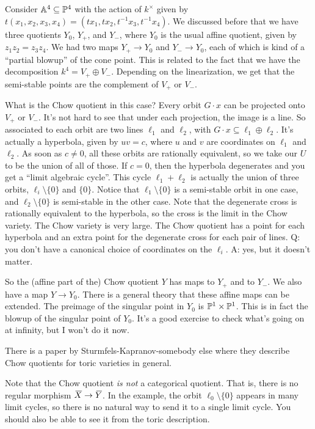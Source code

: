 \begin{example}
 Consider $\mathbb{A}^4\subseteq \mathbb{P}^4$ with the action of $k^\times$ given by $t(x_1,x_2,x_3,x_4)=(tx_1,tx_2,t^{-1}x_3,t^{-1}x_4)$. We discussed before that we have three quotients $Y_0$, $Y_+$, and $Y_-$, where $Y_0$ is the usual affine quotient, given by $z_1z_2=z_3z_4$. We had two maps $Y_+\to Y_0$ and $Y_-\to Y_0$, each of which is kind of a ``partial blowup'' of the cone point. This is related to the fact that we have the decomposition $k^4=V_+\oplus V_-$. Depending on the linearization, we get that the semi-stable points are the complement of $V_+$ or $V_-$.
 
 What is the Chow quotient in this case? Every orbit $G\cdot x$ can be projected onto $V_+$ or $V_-$. It's not hard to see that under each projection, the image is a line. So associated to each orbit are two lines $\ell_1$ and $\ell_2$, with $G\cdot x\subseteq \ell_1\oplus \ell_2$. It's actually a hyperbola, given by $uv=c$, where $u$ and $v$ are coordinates on $\ell_1$ and $\ell_2$. As soon as $c\neq 0$, all these orbits are rationally equivalent, so we take our $U$ to be the union of all of those. If $c=0$, then the hyperbola degenerates and you get a ``limit algebraic cycle''. This cycle $\ell_1+\ell_2$ is actually the union of three orbits, $\ell_i\setminus\{0\}$ and $\{0\}$. Notice that $\ell_1\setminus\{0\}$ is a semi-stable orbit in one case, and $\ell_2\setminus\{0\}$ is semi-stable in the other case. Note that the degenerate cross is rationally equivalent to the hyperbola, so the cross is the limit in the Chow variety. The Chow variety is very large. The Chow quotient has a point for each hyperbola and an extra point for the degenerate cross for each pair of lines. Q: you don't have a canonical choice of coordinates on the $\ell_i$. A: yes, but it doesn't matter.
 
 So the (affine part of the) Chow quotient $Y$ has maps to $Y_+$ and to $Y_-$.  We also have a map $Y\to Y_0$. There is a general theory that these affine maps can be extended. The preimage of the singular point in $Y_0$ is $\mathbb{P}^1\times \mathbb{P}^1$. This is in fact the blowup of the singular point of $Y_0$. It's a good exercise to check what's going on at infinity, but I won't do it now.
 
 There is a paper by Sturmfels-Kapranov-somebody else where they describe Chow quotients for toric varieties in general.
\end{example}
\begin{remark}
 Note that the Chow quotient \emph{is not} a categorical quotient. That is, there is no regular morphism $\bbar X\to \bbar Y$. In the example, the orbit $\ell_0\setminus\{0\}$ appears in many limit cycles, so there is no natural way to send it to a single limit cycle. You should also be able to see it from the toric description.
\end{remark}
